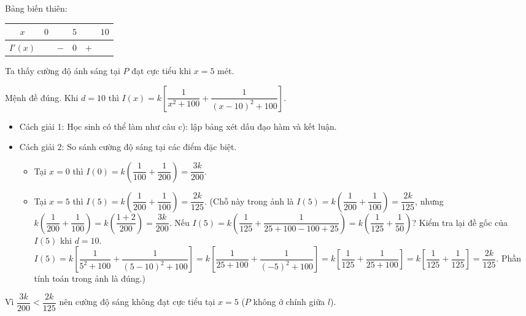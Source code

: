 \begin{ex}
{\begin{listEX}
     Bảng biến thiên:
     \begin{center}
         \begin{tabular}{|c|ccccc|}
             \hline
             $x$ & $0$ & & $5$ & & $10$ \\
             \hline
             $I'(x)$ & & $-$ & $0$ & $+$ & \\
             \hline
         \end{tabular}
     \end{center}
     Ta thấy cường độ ánh sáng tại $P$ đạt cực tiểu khi $x=5$ mét.
     \item Mệnh đề đúng.
     Khi $d=10$ thì $I(x) = k\left[\dfrac{1}{x^2+100} + \dfrac{1}{(x-10)^2+100}\right]$.
     \begin{itemize}
         \item Cách giải 1: Học sinh có thể làm như câu c): lập bảng xét dấu đạo hàm và kết luận.
         \item Cách giải 2: So sánh cường độ sáng tại các điểm đặc biệt.
         \begin{itemize}
             \item Tại $x=0$ thì $I(0) = k\left(\dfrac{1}{100} + \dfrac{1}{200}\right) = \dfrac{3k}{200}$.
             \item Tại $x=5$ thì $I(5) = k\left(\dfrac{1}{200} + \dfrac{1}{100}\right) = \dfrac{2k}{125}$. (Chỗ này trong ảnh là $I(5) = k(\dfrac{1}{200} + \dfrac{1}{100}) = \dfrac{2k}{125}$, nhưng $k(\dfrac{1}{200} + \dfrac{1}{100}) = k(\dfrac{1+2}{200}) = \dfrac{3k}{200}$. Nếu $I(5) = k(\dfrac{1}{125} + \dfrac{1}{25+100-100+25}) = k(\dfrac{1}{125}+\dfrac{1}{50})$? Kiểm tra lại đề gốc của $I(5)$ khi $d=10$. $I(5) = k\left[\dfrac{1}{5^2+100} + \dfrac{1}{(5-10)^2+100}\right] = k\left[\dfrac{1}{25+100} + \dfrac{1}{(-5)^2+100}\right] = k\left[\dfrac{1}{125} + \dfrac{1}{25+100}\right] = k\left[\dfrac{1}{125} + \dfrac{1}{125}\right] = \dfrac{2k}{125}$. Phần tính toán trong ảnh là đúng.)
         \end{itemize}
     \end{itemize}
     Vì $\dfrac{3k}{200} < \dfrac{2k}{125}$ nên cường độ sáng không đạt cực tiểu tại $x=5$ ($P$ không ở chính giữa $l$).
 \end{listEX}}
 \end{ex}
% 
